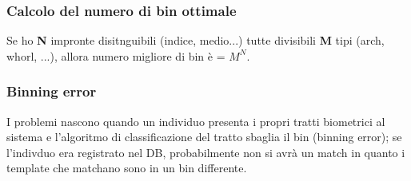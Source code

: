 \subsubsection{Calcolo del numero di bin ottimale}

Se ho \textbf{N} impronte disitnguibili (indice, medio...) tutte divisibili \textbf{M} tipi (arch, whorl, ...), allora 
numero migliore di bin è = \textbf{$M^N$}.

\subsubsection{Binning error}

I  problemi nascono quando un individuo presenta i propri
tratti biometrici al sistema e l’algoritmo di classificazione
del tratto sbaglia il bin (binning error); se l'indivduo era registrato nel DB, probabilmente non si avrà un match in quanto i template che matchano sono in un bin differente.





